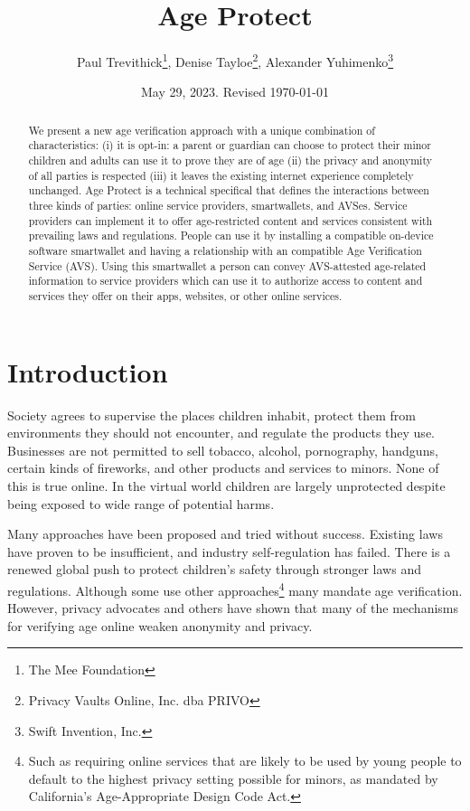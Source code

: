 \documentclass[11pt, oneside]{article}   	%
\title{Age Protect}
\author{Paul Trevithick\footnote{The Mee Foundation}, Denise Tayloe\footnote{Privacy Vaults Online, Inc. dba PRIVO}, Alexander Yuhimenko\footnote{Swift Invention, Inc.}}
\date{May 29, 2023. Revised \today}
\begin{document}
\maketitle
\begin{abstract}
	We present a new age verification approach with a unique combination of characteristics: (i) it is opt-in: a parent or guardian can choose to protect their minor children and adults can use it to prove they are of age (ii) the privacy and anonymity of all parties is respected (iii) it leaves the existing internet experience completely unchanged. Age Protect is a technical specifical that defines the interactions between three kinds of parties: online service providers, smartwallets, and AVSes. Service providers can implement it to offer age-restricted content and services consistent with prevailing laws and regulations. People can use it by installing a compatible on-device software smartwallet and having a relationship with an compatible Age Verification Service (AVS). Using this smartwallet a person can convey AVS-attested age-related information to service providers which can use it to authorize access to content and services they offer on their apps, websites, or other online services. 
\end{abstract}

\section{Introduction}

Society agrees to supervise the places children inhabit, protect them from environments they should not encounter, and regulate the products they use. Businesses are not permitted to sell tobacco, alcohol, pornography, handguns, certain kinds of fireworks, and other products and services to minors. None of this is true online. In the virtual world children are largely unprotected despite being exposed to wide range of potential harms. 

Many approaches have been proposed and tried without success. Existing laws have proven to be insufficient, and industry self-regulation has failed. There is a renewed global push to protect children's safety through stronger laws and regulations. Although some use other approaches\footnote{Such as requiring online services that are likely to be used by young people to default to the highest privacy setting possible for minors, as mandated by California's Age-Appropriate Design Code Act.} many mandate age verification.\cite{Griswold2023}\cite{Jackson2023} However, privacy advocates and others have shown that many of the mechanisms for verifying age online weaken anonymity and privacy.\cite{Roth2023} 
\end{document}
